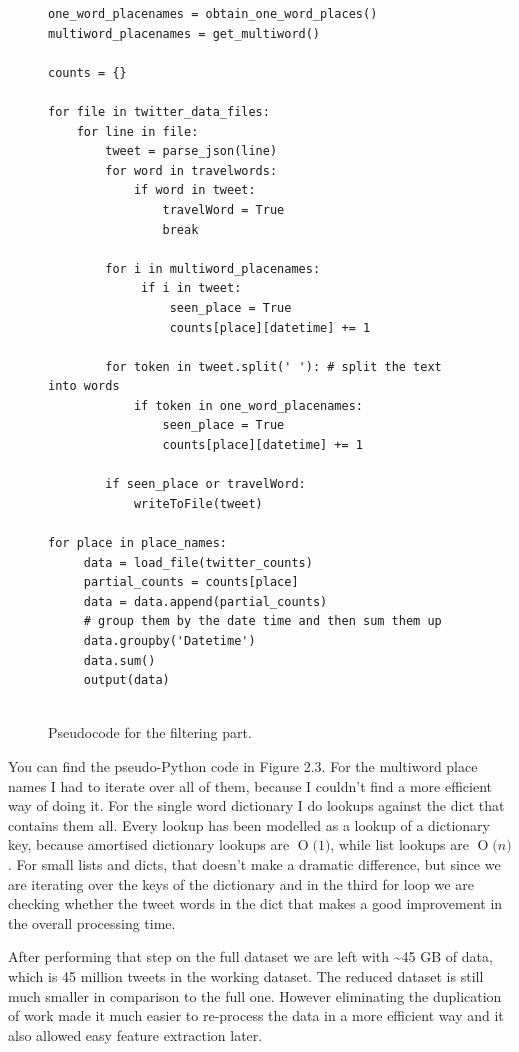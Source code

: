 \documentclass[minf,twoside,singlespacing,parskip,frontabs]{infthesis}
\newcommand{\BigO}[1]{\ensuremath{\operatorname{O}\bigl(#1\bigr)}}
\begin{document}
\begin{figure}[]
\begin{center}
\begin{lstlisting}
one_word_placenames = obtain_one_word_places()
multiword_placenames = get_multiword()

counts = {}

for file in twitter_data_files:
    for line in file:
        tweet = parse_json(line)
        for word in travelwords: 
            if word in tweet:
                travelWord = True
                break
                            
        for i in multiword_placenames:
             if i in tweet:
                 seen_place = True
                 counts[place][datetime] += 1
                            
        for token in tweet.split(' '): # split the text into words
            if token in one_word_placenames:
                seen_place = True
                counts[place][datetime] += 1

        if seen_place or travelWord:
            writeToFile(tweet)

for place in place_names:
     data = load_file(twitter_counts)
     partial_counts = counts[place]
     data = data.append(partial_counts)
     # group them by the date time and then sum them up
     data.groupby('Datetime')
     data.sum()
     output(data)
    
\end{lstlisting}
\end{center}
\caption{Pseudocode for the filtering part. }
\end{figure}

You can find the pseudo-Python code in Figure 2.3. For the multiword place names I had to iterate over all of them, because I couldn't find a more efficient way of doing it. For the single word dictionary I do lookups against the dict that contains them all. Every lookup has been modelled as a lookup of a dictionary key, because amortised dictionary lookups are  \BigO{1}, while list lookups are  \BigO{n}. For small lists and dicts, that doesn't make a dramatic difference, but since we are iterating over the keys of the dictionary and in the third for loop we are checking whether the tweet words in the dict that makes a good improvement in the overall processing time. 


After performing that step on the full dataset we are left with  \textasciitilde  45 GB of data, which is 45 million tweets in the working dataset. The reduced dataset is still much smaller in comparison to the full one. However eliminating the duplication of work made it much easier to re-process the data in a more efficient way and it also allowed easy feature extraction later. 
\end{document}
